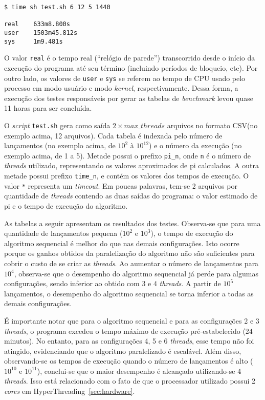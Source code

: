 \documentclass[12pt,a4paper]{article}
\begin{document}
\begin{verbatim}
$ time sh test.sh 6 12 5 1440

real    633m8.800s
user    1503m45.812s
sys     1m9.481s
\end{verbatim}

O valor \texttt{real} é o tempo real (``relógio de parede'') transcorrido desde
o início da execução do programa até seu término (incluindo períodos de
bloqueio, etc). Por outro lado, os valores de \texttt{user} e \texttt{sys} se
referem ao tempo de CPU usado pelo processo em modo usuário e modo
\textit{kernel}, respectivamente. Dessa forma, a execução dos testes
responsáveis por gerar as tabelas de \textit{benchmark} levou quase 11 horas
para ser concluída.

O \textit{script} \texttt{test.sh} gera como saída $2 \times max\_threads$
arquivos no formato CSV\@ (no exemplo acima, 12 arquivos). Cada tabela é
indexada pelo número de lançamentos (no exemplo acima, de $10^2$ à $10^{12}$) e
o número da execução (no exemplo acima, de 1 a 5).  Metade possui o prefixo
\texttt{pi\_{n}}, onde \texttt{n} é o número de \textit{threads} utilizado,
representando os valores aproximados de pi calculados. A outra metade possui
prefixo \texttt{time\_{n}}, e contém os valores dos tempos de execução. O valor
\texttt{*} representa um \textit{timeout}. Em poucas palavras, tem-se 2 arquivos
por quantidade de \textit{threads} contendo as duas saídas do programa: o valor
estimado de pi e o tempo de execução do algoritmo.

As tabelas a seguir apresentam os resultados dos testes. Observa-se que para uma
quantidade de lançamentos pequena ($10^2$ e $10^3$), o tempo de execução do
algoritmo sequencial é melhor do que nas demais configurações. Isto ocorre
porque os ganhos obtidos da paralelização do algoritmo não são suficientes para
cobrir o custo de se criar as \textit{threads}. Ao aumentar o número
de lançamentos para $10^4$, observa-se que o desempenho do algoritmo sequencial
já perde para algumas configurações, sendo inferior ao obtido com 3 e 4
\textit{threads}. A partir de $10^5$ lançamentos, o desempenho do algoritmo
sequencial se torna inferior a todas as demais configurações.

É importante notar que para o algoritmo sequencial e para as configurações 2 e 3
\textit{threads}, o programa excedeu o tempo máximo de execução pré-estabelecido
(24 minutos). No entanto, para as configurações 4, 5 e 6 \textit{threads}, esse
tempo não foi atingido, evidenciando que o algoritmo paralelizado é escalável.
Além disso, observando-se os tempos de execução quando o número de lançamentos é
alto ($10^{10}$ e $10^{11}$), conclui-se que o maior desempenho é alcançado
utilizando-se 4 \textit{threads}. Isso está relacionado com o fato de que o
processador utilizado possui 2 \textit{cores} em
HyperThreading~\ref{sec:hardware}.
\end{document}
